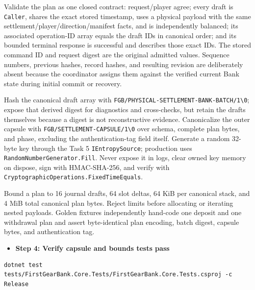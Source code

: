 \documentclass[
  10pt,
  letterpaper,
]{article}
\newcommand{\passthrough}[1]{#1}
\providecommand{\tightlist}{%
  \setlength{\itemsep}{0pt}\setlength{\parskip}{0pt}}
\begin{document}
Validate the plan as one closed contract: request/player agree; every
draft is \passthrough{\lstinline!Caller!}, shares the exact stored
timestamp, uses a physical payload with the same
settlement/\allowbreak{}player/\allowbreak{}direction/\allowbreak{}manifest
facts, and is independently balanced; its associated operation-ID array
equals the draft IDs in canonical order; and its bounded terminal
response is successful and describes those exact IDs. The stored command
ID and request digest are the original admitted values. Sequence
numbers, previous hashes, record hashes, and resulting revision are
deliberately absent because the coordinator assigns them against the
verified current Bank state during initial commit or recovery.

Hash the canonical draft array with
\texttt{FGB/}\allowbreak{}\texttt{PHYSICAL-}\allowbreak{}\texttt{SETTLEMENT-}\allowbreak{}\texttt{BANK-}\allowbreak{}\texttt{BATCH/}\allowbreak{}\texttt{1\textbackslash{}}\allowbreak{}\texttt{0};
expose that derived digest for diagnostics and cross-checks, but retain
the drafts themselves because a digest is not reconstructive evidence.
Canonicalize the outer capsule with
\texttt{FGB/}\allowbreak{}\texttt{SETTLEMENT-}\allowbreak{}\texttt{CAPSULE/}\allowbreak{}\texttt{1\textbackslash{}}\allowbreak{}\texttt{0}
over schema, complete plan bytes, and phase, excluding the
authentication-tag field itself. Generate a random 32-byte key through
the Task 5 \passthrough{\lstinline!IEntropySource!}; production uses
\texttt{RandomNumberGenerator.}\allowbreak{}\texttt{Fill}. Never expose
it in logs, clear owned key memory on dispose, sign with HMAC-SHA-256,
and verify with
\texttt{CryptographicOperations.}\allowbreak{}\texttt{FixedTimeEquals}.

Bound a plan to 16 journal drafts, 64 slot deltas, 64 KiB per canonical
stack, and 4 MiB total canonical plan bytes. Reject limits before
allocating or iterating nested payloads. Golden fixtures independently
hand-code one deposit and one withdrawal plan and assert byte-identical
plan encoding, batch digest, capsule bytes, and authentication tag.

\begin{itemize}
\tightlist
\item[$\square$]
  \textbf{Step 4: Verify capsule and bounds tests pass}
\end{itemize}

\begin{lstlisting}
dotnet test tests/FirstGearBank.Core.Tests/FirstGearBank.Core.Tests.csproj -c Release
\end{lstlisting}
\end{document}
